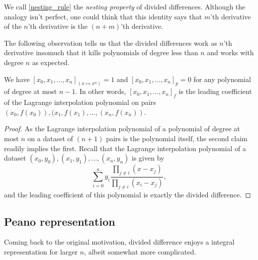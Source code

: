 We call \ref{nesting_rule} the \textit{nesting property} of divided differences. Although the analogy isn't perfect, one could think that this identity says that $m$'th derivative of the $n$'th derivative is the $(n + m)$'th derivative. 

The following observation tells us that the divided differences work as $n$'th derivative insomuch that it kills polynomials of degree less than $n$ and works with degree $n$ as expected.

\begin{prop}\label{lagrange_divided}
We have $[x_{0}, x_{1}, \ldots, x_{n}]_{(x \mapsto x^{n})} = 1$ and $[x_{0}, x_{1}, \ldots, x_{n}]_{p} = 0$ for any polynomial of degree at most $n - 1$. In other words, $[x_{0}, x_{1}, \ldots, x_{n}]_{f}$ is the leading coefficient of the Lagrange interpolation polynomial on pairs $(x_{0}, f(x_{0})), (x_{1}, f(x_{1}), \ldots, (x_{n}, f(x_{n}))$.
\end{prop}
\begin{proof}
	As the Lagrange interpolation polynomial of a polynomial of degree at most $n$ on a dataset of $(n + 1)$ pairs is the polynomial itself, the second claim readily implies the first. Recall that the Lagrange interpolation polynomial of a dataset $(x_{0}, y_{0}), (x_{1}, y_{1}), \ldots, (x_{n}, y_{n})$ is given by
	\[
		\sum_{i = 0}^{n} y_{i} \frac{\prod_{j \neq i}(x - x_{j})}{\prod_{j \neq i}(x_{i} - x_{j})},
	\]
	and the leading coefficient of this polynomial is exactly the divided difference.
\end{proof}

\subsection{Peano representation}

Coming back to the original motivation, divided difference enjoys a integral representation for larger $n$, albeit somewhat more complicated.

